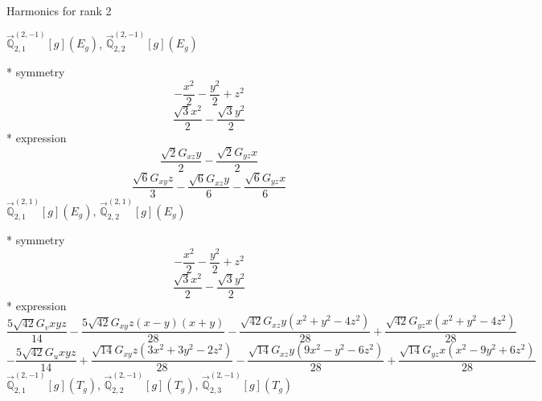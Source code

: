 \documentclass[fleqn,8pt]{jsarticle}
\begin{document}
\noindent * Harmonics for rank 2

\noindent\quad $\vec{\mathbb{Q}}_{2,1}^{(2,-1)}[g](E_{g})$, $\vec{\mathbb{Q}}_{2,2}^{(2,-1)}[g](E_{g})$

\noindent\quad ** symmetry
\begin{dmath*}
- \frac{x^{2}}{2} - \frac{y^{2}}{2} + z^{2}
\end{dmath*}
\begin{dmath*}
\frac{\sqrt{3} x^{2}}{2} - \frac{\sqrt{3} y^{2}}{2}
\end{dmath*}
\noindent\quad ** expression
\begin{dmath*}
\frac{\sqrt{2} G_{xz} y}{2} - \frac{\sqrt{2} G_{yz} x}{2}
\end{dmath*}
\begin{dmath*}
\frac{\sqrt{6} G_{xy} z}{3} - \frac{\sqrt{6} G_{xz} y}{6} - \frac{\sqrt{6} G_{yz} x}{6}
\end{dmath*}
\noindent\quad $\vec{\mathbb{Q}}_{2,1}^{(2,1)}[g](E_{g})$, $\vec{\mathbb{Q}}_{2,2}^{(2,1)}[g](E_{g})$

\noindent\quad ** symmetry
\begin{dmath*}
- \frac{x^{2}}{2} - \frac{y^{2}}{2} + z^{2}
\end{dmath*}
\begin{dmath*}
\frac{\sqrt{3} x^{2}}{2} - \frac{\sqrt{3} y^{2}}{2}
\end{dmath*}
\noindent\quad ** expression
\begin{dmath*}
\frac{5 \sqrt{42} G_{v} x y z}{14} - \frac{5 \sqrt{42} G_{xy} z \left(x - y\right) \left(x + y\right)}{28} - \frac{\sqrt{42} G_{xz} y \left(x^{2} + y^{2} - 4 z^{2}\right)}{28} + \frac{\sqrt{42} G_{yz} x \left(x^{2} + y^{2} - 4 z^{2}\right)}{28}
\end{dmath*}
\begin{dmath*}
- \frac{5 \sqrt{42} G_{u} x y z}{14} + \frac{\sqrt{14} G_{xy} z \left(3 x^{2} + 3 y^{2} - 2 z^{2}\right)}{28} - \frac{\sqrt{14} G_{xz} y \left(9 x^{2} - y^{2} - 6 z^{2}\right)}{28} + \frac{\sqrt{14} G_{yz} x \left(x^{2} - 9 y^{2} + 6 z^{2}\right)}{28}
\end{dmath*}
\noindent\quad $\vec{\mathbb{Q}}_{2,1}^{(2,-1)}[g](T_{g})$, $\vec{\mathbb{Q}}_{2,2}^{(2,-1)}[g](T_{g})$, $\vec{\mathbb{Q}}_{2,3}^{(2,-1)}[g](T_{g})$
\end{document}

